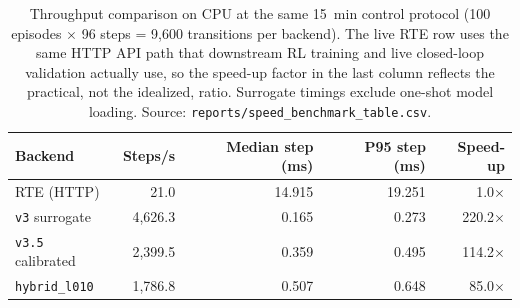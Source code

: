 \begin{table}[t]
  \centering
  \caption{Throughput comparison on CPU at the same \SI{15}{\minute} control protocol (100 episodes $\times$ 96 steps = 9{,}600 transitions per backend). The live \boptest{} RTE row uses the same HTTP API path that downstream RL training and live closed-loop validation actually use, so the speed-up factor in the last column reflects the practical, not the idealized, ratio. Surrogate timings exclude one-shot model loading. Source: \texttt{reports/speed\_benchmark\_table.csv}.}
  \label{tab:speed}
  \begin{tabular}{lrrrr}
    \toprule
    Backend & Steps/s & Median step (ms) & P95 step (ms) & Speed-up \\
    \midrule
    \boptest{} RTE (HTTP) & 21.0 & 14.915 & 19.251 & 1.0$\times$ \\
    \texttt{v3} surrogate & 4,626.3 & 0.165 & 0.273 & 220.2$\times$ \\
    \texttt{v3.5} calibrated & 2,399.5 & 0.359 & 0.495 & 114.2$\times$ \\
    \texttt{hybrid\_l010} & 1,786.8 & 0.507 & 0.648 & 85.0$\times$ \\
    \bottomrule
  \end{tabular}
\end{table}
